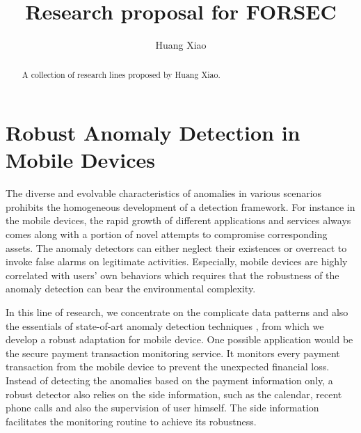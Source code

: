 \documentclass{llncs}
\begin{document}
\title{Research proposal for FORSEC} 
\author{Huang Xiao} %
\maketitle
\vspace{20mm}
\begin{abstract}
  A collection of research lines proposed by Huang Xiao.
\end{abstract}
\section{Robust Anomaly Detection in Mobile Devices}

The diverse and evolvable characteristics of anomalies in various scenarios prohibits the homogeneous development of a detection framework. For instance in the mobile devices, the rapid growth of different applications and services  always comes along with a portion of novel attempts to compromise corresponding assets. The anomaly detectors can either neglect their existences or overreact to invoke false alarms on legitimate activities. Especially, mobile devices are highly correlated with users' own behaviors which requires that the robustness of the anomaly detection can bear the environmental complexity.

In this line of research, we concentrate on the complicate data patterns and also the essentials of state-of-art anomaly detection techniques \cite{horn01,kim11}, from which we develop a robust adaptation for mobile device. One possible application would be the secure payment transaction monitoring service. It monitors every payment transaction from the mobile device to prevent the unexpected financial loss. Instead of detecting the anomalies based on the payment information only, a robust detector also relies on the side information, such as the calendar, recent phone calls and also the supervision of user himself. The side information facilitates the monitoring routine to achieve its robustness.   




\end{document}
